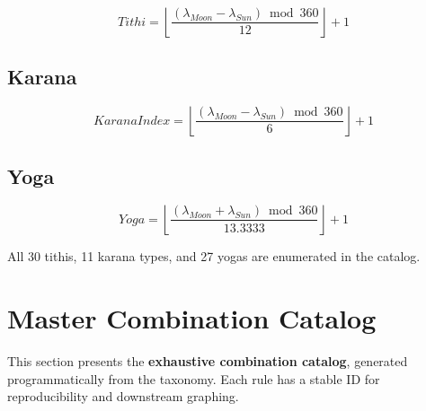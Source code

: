 \documentclass[
  11pt,
  a4paper,
  oneside,
  openany]{report}
\begin{document}
\[
Tithi = \left\lfloor \frac{(\lambda_{Moon}-\lambda_{Sun}) \bmod 360}{12} \right\rfloor + 1
\]

\section{Karana}\label{karana}

\[
KaranaIndex = \left\lfloor \frac{(\lambda_{Moon}-\lambda_{Sun}) \bmod 360}{6} \right\rfloor + 1
\]

\section{Yoga}\label{yoga}

\[
Yoga = \left\lfloor \frac{(\lambda_{Moon}+\lambda_{Sun}) \bmod 360}{13.3333} \right\rfloor + 1
\]

All 30 tithis, 11 karana types, and 27 yogas are enumerated in the
catalog.

\chapter{Master Combination Catalog}\label{master-combination-catalog}

This section presents the \textbf{exhaustive combination catalog},
generated programmatically from the taxonomy. Each rule has a stable ID
for reproducibility and downstream graphing.
\end{document}
